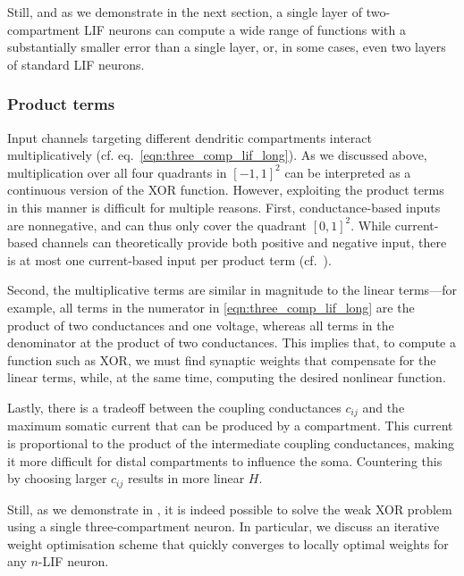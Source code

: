 Still, and as we demonstrate in the next section, a single layer of two-compartment LIF neurons can compute a wide range of functions with a substantially smaller error than a single layer, or, in some cases, even two layers of standard LIF neurons.

\subsubsection{Product terms}
Input channels targeting different dendritic compartments interact multiplicatively (cf. eq.~\ref{eqn:three_comp_lif_long}).
As we discussed above, multiplication over all four quadrants in $[-1, 1]^2$ can be interpreted as a continuous version of the XOR function.
However, exploiting the product terms in this manner is difficult for multiple reasons.
First, conductance-based inputs are nonnegative, and can thus only cover the quadrant $[0, 1]^2$.
While current-based channels can theoretically provide both positive and negative input, there is at most one current-based input per product term (cf.~).

Second, the multiplicative terms are similar in magnitude to the linear terms---for example, all terms in the numerator in \cref{eqn:three_comp_lif_long} are the product of two conductances and one voltage, whereas all terms in the denominator at the product of two conductances.
This implies that, to compute a function such as XOR, we must find synaptic weights that compensate for the linear terms, while, at the same time, computing the desired nonlinear function.

Lastly, there is a tradeoff between the coupling conductances $c_{ij}$ and the maximum somatic current that can be produced by a compartment.
This current is proportional to the product of the intermediate coupling conductances, making it more difficult for distal compartments to influence the soma.
Countering this by choosing larger $c_{ij}$ results in more linear $H$.

Still, as we demonstrate in , it is indeed possible to solve the weak XOR problem using a single three-compartment neuron.
In particular, we discuss an iterative weight optimisation scheme that quickly converges to locally optimal weights for any $n$-LIF neuron.

